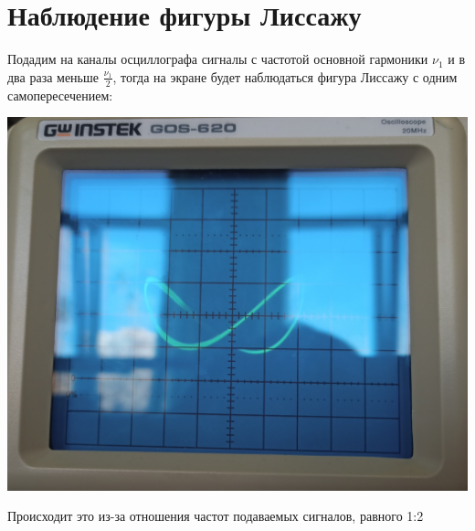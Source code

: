 \documentclass[a4paper,12pt]{article} %
\begin{document}
\section{Наблюдение фигуры Лиссажу}
Подадим на каналы осциллографа сигналы с частотой основной гармоники $\nu_1$ и в два раза меньше $\frac{\nu_1}{2}$, тогда на экране будет наблюдаться фигура Лиссажу с одним самопересечением:
\begin{center}
\includegraphics[scale=0.2]{lis}
\end{center}
Происходит это из-за отношения частот подаваемых сигналов, равного 1:2
\end{document}
